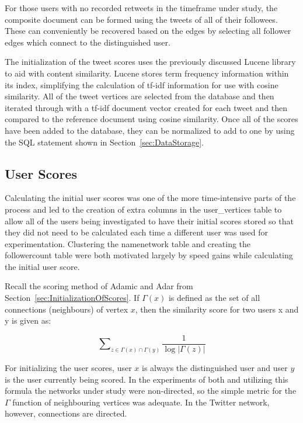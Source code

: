 For those users with no recorded retweets in the timeframe under study, the composite document can be formed using the tweets of all of their followees. These can conveniently be recovered based on the edges by selecting all follower edges which connect to the distinguished user.

The initialization of the tweet scores uses the previously discussed Lucene library to aid with content similarity. Lucene stores term frequency information within its index, simplifying the calculation of tf-idf information for use with cosine similarity. All of the tweet vertices are selected from the database and then iterated through with a tf-idf document vector created for each tweet and then compared to the reference document using cosine similarity. Once all of the scores have been added to the database, they can be normalized to add to one by using the SQL statement shown in Section~\ref{sec:DataStorage}. 

\subsection{User Scores}

Calculating the initial user scores was one of the more time-intensive parts of the process and led to the creation of extra columns in the user\_vertices table to allow all of the users being investigated to have their initial scores stored so that they did not need to be calculated each time a different user was used for experimentation. Clustering the namenetwork table and creating the followercount table were both motivated largely by speed gains while calculating the initial user score.

Recall the scoring method of Adamic and Adar from Section~\ref{sec:InitializationOfScores}. If $\Gamma (x)$ is defined as the set of all connections (neighbours) of vertex $x$, then the similarity score for two users x and y is given as: 

\begin{center}
\[
\sum\nolimits_{z \in \Gamma (x) \cap \Gamma (y)} \frac{1}{\log |\Gamma (z) |}
\]
\end{center}

For initializing the user scores, user $x$ is always the distinguished user and user $y$ is the user currently being scored. In the experiments of both \cite{Adamic2003} and \cite{LibenNowell2007} utilizing this formula the networks under study were non-directed, so the simple metric for the $\Gamma$ function of neighbouring vertices was adequate. In the Twitter network, however, connections are directed.

